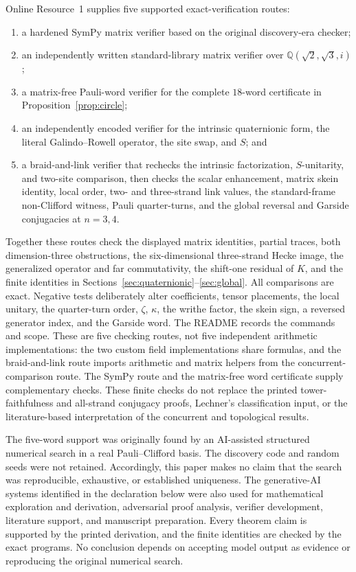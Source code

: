 \documentclass[11pt]{article}
\theoremstyle{remark}
\newcommand{\bbQ}{\mathbb Q}
\begin{document}
Online Resource~1 supplies five supported exact-verification routes:
\begin{enumerate}[leftmargin=2.2em,itemsep=0.25em]
\item a hardened SymPy matrix verifier based on the original discovery-era
checker;
\item an independently written standard-library matrix verifier over
\(\bbQ(\sqrt2,\sqrt3,i)\);
\item a matrix-free Pauli-word verifier for the complete \(18\)-word
certificate in Proposition~\ref{prop:circle};
\item an independently encoded verifier for the intrinsic quaternionic form,
the literal Galindo--Rowell operator, the site swap, and \(S\); and
\item a braid-and-link verifier that rechecks the intrinsic factorization,
\(S\)-unitarity, and two-site comparison, then checks the scalar enhancement,
matrix skein identity, local order, two- and three-strand link values, the
standard-frame non-Clifford witness, Pauli quarter-turns, and the global
reversal and Garside conjugacies at \(n=3,4\).
\end{enumerate}
Together these routes check the displayed matrix identities, partial traces,
both dimension-three obstructions, the six-dimensional three-strand Hecke
image, the generalized operator and far commutativity, the shift-one
residual of \(K\), and the finite identities
in Sections~\ref{sec:quaternionic}--\ref{sec:global}.  All comparisons are
exact.  Negative tests deliberately alter coefficients, tensor placements,
the local unitary, the quarter-turn order, \(\zeta\), \(\kappa\), the writhe
factor, the skein sign, a reversed generator index, and the Garside word.  The
README records the commands and scope.  These are five checking routes,
not five independent arithmetic implementations: the two custom field
implementations share formulas, and the braid-and-link route imports
arithmetic and matrix helpers from the concurrent-comparison route.
The SymPy route and the matrix-free word certificate supply complementary
checks.  These finite checks do not replace the
printed tower-faithfulness and all-strand conjugacy proofs, Lechner's
classification input, or the literature-based interpretation of the
concurrent and topological results.

The five-word support was originally found by an AI-assisted structured
numerical search in a real Pauli--Clifford basis.  The discovery code and
random seeds were not retained.  Accordingly, this paper makes no claim that
the search was reproducible, exhaustive, or established uniqueness.  The
generative-AI systems identified in the declaration below were also used for
mathematical exploration and derivation, adversarial proof analysis, verifier
development, literature support, and manuscript preparation.  Every theorem
claim is supported by the printed derivation, and the finite identities are
checked by the exact programs.  No conclusion depends on accepting model
output as evidence or reproducing the original numerical search.
\end{document}

